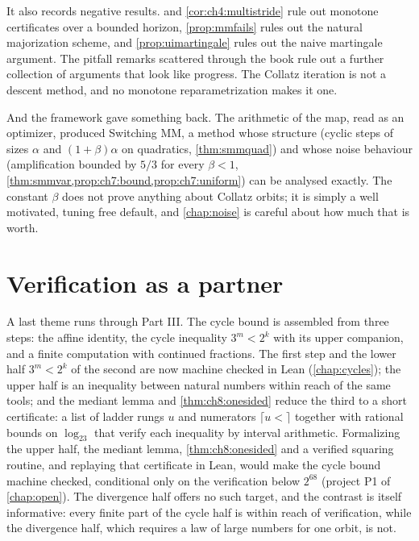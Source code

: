 \begin{sloppypar}
It also records negative results.  and
\cref{cor:ch4:multistride} rule out monotone certificates over a bounded horizon,
\cref{prop:mmfails} rules out the natural majorization scheme, and
\cref{prop:uimartingale} rules out the naive martingale argument. The pitfall remarks scattered through the book
rule out a further collection of arguments that look like progress. The
Collatz iteration is not a descent method, and no monotone reparametrization
makes it one.
\end{sloppypar}

And the framework gave something back. The arithmetic of the map, read as an
optimizer, produced Switching MM, a method whose structure (cyclic steps of
sizes $\alpha$ and $(1+\beta)\alpha$ on quadratics, \cref{thm:smmquad}) and
whose noise behaviour (amplification bounded by $5/3$ for every $\beta<1$,
\cref{thm:smmvar,prop:ch7:bound,prop:ch7:uniform}) can be analysed exactly. The constant $\beta$ does not prove
anything about Collatz orbits; it is simply a well motivated, tuning free
default, and \cref{chap:noise} is careful about how much that is worth.

\section{Verification as a partner}\label{sec:ch10:verification}

A last theme runs through Part III. The cycle bound is assembled from three
steps: the affine identity, the cycle inequality $3^m<2^k$ with its upper
companion, and a finite computation with continued fractions. The first step
and the lower half $3^m<2^k$ of the second are now machine checked in Lean
(\cref{chap:cycles}); the upper half is an inequality between natural numbers
within reach of the same tools; and the mediant lemma and \cref{thm:ch8:onesided} reduce the third to a
short certificate: a list of ladder rungs $u$ and numerators $\lceil u\lt\rceil$ together with
rational bounds on $\log_23$ that verify each inequality by interval
arithmetic. Formalizing the upper half, the mediant lemma, \cref{thm:ch8:onesided} and a verified squaring routine, and replaying that certificate in Lean, would make the cycle bound machine checked, conditional only on the verification below $2^{68}$ (project P1 of \cref{chap:open}). The
divergence half offers no such target, and the contrast is itself informative:
every finite part of the cycle half is within reach of verification, while the
divergence half, which requires a law of large numbers for one orbit, is not.

